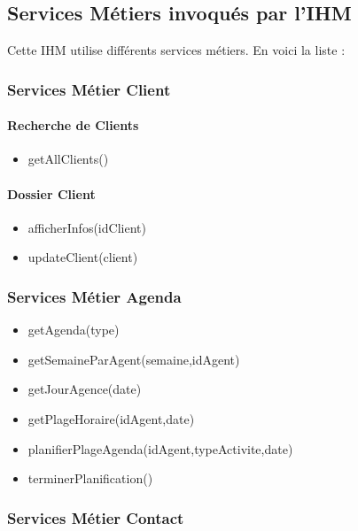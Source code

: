\subsection{Services Métiers invoqués par l'IHM}

Cette IHM utilise différents services métiers. En voici la liste :

\subsubsection{Services Métier Client}

\paragraph{Recherche de Clients}

\begin{itemize}
\item getAllClients()
\end{itemize}

\paragraph{Dossier Client}

\begin{itemize}
\item afficherInfos(idClient)
\item updateClient(client)
\end{itemize}

\subsubsection{Services Métier Agenda}

\begin{itemize}
\item getAgenda(type)
\item getSemaineParAgent(semaine,idAgent)
\item getJourAgence(date)
\item getPlageHoraire(idAgent,date)
\item planifierPlageAgenda(idAgent,typeActivite,date)
\item terminerPlanification()
\end{itemize}

\subsubsection{Services Métier Contact}

